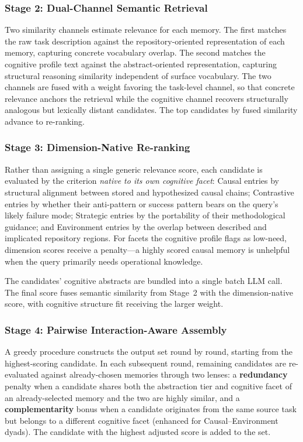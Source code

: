 \documentclass[letterpaper]{article} %
\begin{document}
\subsubsection{Stage 2: Dual-Channel Semantic Retrieval}

Two similarity channels estimate relevance for each memory. The first matches the raw task description against the repository-oriented representation of each memory, capturing concrete vocabulary overlap. The second matches the cognitive profile text against the abstract-oriented representation, capturing structural reasoning similarity independent of surface vocabulary. The two channels are fused with a weight favoring the task-level channel, so that concrete relevance anchors the retrieval while the cognitive channel recovers structurally analogous but lexically distant candidates. The top candidates by fused similarity advance to re-ranking.

\subsubsection{Stage 3: Dimension-Native Re-ranking}

Rather than assigning a single generic relevance score, each candidate is evaluated by the criterion \emph{native to its own cognitive facet}: Causal entries by structural alignment between stored and hypothesized causal chains; Contrastive entries by whether their anti-pattern or success pattern bears on the query's likely failure mode; Strategic entries by the portability of their methodological guidance; and Environment entries by the overlap between described and implicated repository regions. For facets the cognitive profile flags as low-need, dimension scores receive a penalty---a highly scored causal memory is unhelpful when the query primarily needs operational knowledge.

The candidates' cognitive abstracts are bundled into a single batch LLM call. The final score fuses semantic similarity from Stage~2 with the dimension-native score, with cognitive structure fit receiving the larger weight.

\subsubsection{Stage 4: Pairwise Interaction-Aware Assembly}

A greedy procedure constructs the output set round by round, starting from the highest-scoring candidate. In each subsequent round, remaining candidates are re-evaluated against already-chosen memories through two lenses: a \textbf{redundancy} penalty when a candidate shares both the abstraction tier and cognitive facet of an already-selected memory and the two are highly similar, and a \textbf{complementarity} bonus when a candidate originates from the same source task but belongs to a different cognitive facet (enhanced for Causal--Environment dyads). The candidate with the highest adjusted score is added to the set.
\end{document}
